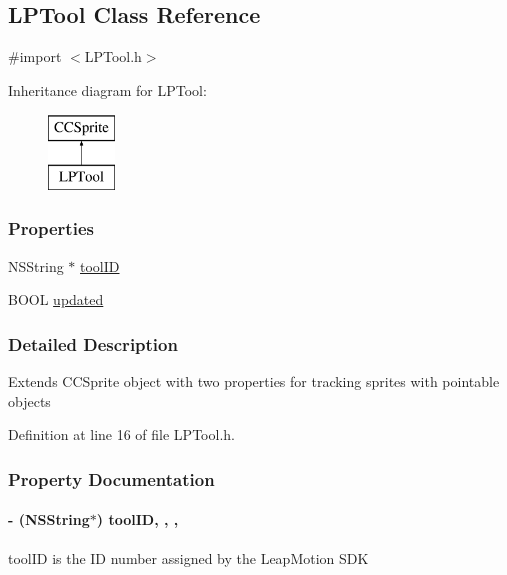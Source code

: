 \hypertarget{interface_l_p_tool}{\subsection{L\-P\-Tool Class Reference}
\label{d3/d2e/interface_l_p_tool}
}


{\ttfamily \#import $<$L\-P\-Tool.\-h$>$}

Inheritance diagram for L\-P\-Tool\-:\begin{figure}[H]
\begin{center}
\leavevmode
\includegraphics[height=2.000000cm]{d3/d2e/interface_l_p_tool}
\end{center}
\end{figure}
\subsubsection*{Properties}
\begin{DoxyCompactItemize}
\item 
N\-S\-String $\ast$ \hyperlink{interface_l_p_tool_aafbd850bbcc6c8e33ba201d45a8107c2}{tool\-I\-D}
\item 
B\-O\-O\-L \hyperlink{interface_l_p_tool_a25dbad647c537177b138bdbbb01936e4}{updated}
\end{DoxyCompactItemize}


\subsubsection{Detailed Description}
Extends C\-C\-Sprite object with two properties for tracking sprites with pointable objects 

Definition at line 16 of file L\-P\-Tool.\-h.



\subsubsection{Property Documentation}
\hypertarget{interface_l_p_tool_aafbd850bbcc6c8e33ba201d45a8107c2}{
\paragraph[{tool\-I\-D}]{\setlength{\rightskip}{0pt plus 5cm}-\/ (N\-S\-String$\ast$) tool\-I\-D\hspace{0.3cm}{\ttfamily [read]}, {\ttfamily [write]}, {\ttfamily [nonatomic]}, {\ttfamily [strong]}}}\label{d3/d2e/interface_l_p_tool_aafbd850bbcc6c8e33ba201d45a8107c2}
tool\-I\-D is the I\-D number assigned by the Leap\-Motion S\-D\-K 

